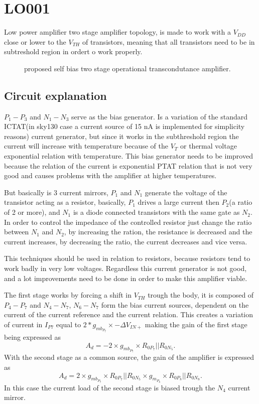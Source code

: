 \documentclass[12pt]{article}
\begin{document}
\section{LO001}
Low power amplifier two stage amplifier topology, is made to work with a $V_{DD}$ close or lower to the $V_{TH}$ of transistors, meaning that all transistors need to be in subtreshold region in ordert o work properly.
\begin{figure}[H]
        \centering
        
        \caption{proposed self bias two stage operational transcondutance amplifier.}
        \label{LOP001}
\end{figure}
\subsection{Circuit explanation}


$P_1-P_3$ and $N_1-N_3$ serve as the bias generator. Is a variation of the standard ICTAT(in sky130 case a current source of 15 nA is implemented for simplicity reasons) current generator, but since it works in the subthreshold region the current will increase with temperature because of the $V_T$ or thermal voltage exponential relation with temperature. This bias generator needs to be improved because the relation of the current is exponential PTAT relation that is not very good and causes problems with the amplifier at higher temperatures.

But basically is 3 current mirrors, $P_1$ and $N_1$ generate the voltage of the transistor acting as a resistor, basically, $P_1$ drives a large current then $P_2$(a ratio of 2 or more), and $N_1$ is a diode connected transistors with the same gate as $N_2$. In order to control the impedance of the controlled resistor just change the ratio between $N_1$ and $N_2$, by increasing the ration, the resistance is decreased and the current increases, by decreasing the ratio, the current decreases and vice versa.

This techniques should be used in relation to resistors, because resistors tend to work badly in very low voltages. Regardless this current generator is not good, and a lot improvements need to be done in order to make this amplifier viable.

The first stage works by forcing a shift in $V_{TH}$ trough the body, it is composed of  $P_4-P_7$ and $N_4-N_7$, $N_6-N_7$ form the bias current sources, dependent on the current of the current reference and the current relation.
This creates a variation of current in  $I_{P7}$ equal to $2*g_{mb_{P_{7}}} \times -\Delta V_{IN+}$ making the gain of the first stage being expressed as 
\begin{equation}
    A_d= -2\times g_{mb_{P_{7}}} \times R_{0P_7}|| R_{0N_5}.
\end{equation}
With the second stage as a common source, the gain of the amplifier is expressed as
\begin{equation}
    A_d= 2 \times g_{mb_{P_{7}}} \times R_{0P_7}|| R_{0N_5} \times  g_{m_{P_8}} \times R_{0P_8}|| R_{0N_8}.
\end{equation}
In this case the current load of the second stage is biased trough the $N_4$ current mirror.
\end{document}
